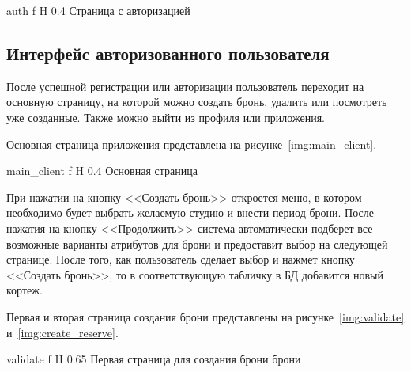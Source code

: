 {auth} %
{f} %
{H} %
{0.4\textwidth} %
{Страница с авторизацией} %



\subsection{Интерфейс авторизованного пользователя}
После успешной регистрации или авторизации пользователь переходит на основную страницу, на которой можно создать бронь, удалить или посмотреть уже созданные.
Также можно выйти из профиля или приложения.

Основная страница приложения представлена на рисунке~\ref{img:main_client}.



{main_client} %
{f} %
{H} %
{0.4\textwidth} %
{Основная страница} %



При нажатии на кнопку <<Создать бронь>> откроется меню, в котором необходимо будет выбрать желаемую студию и внести период брони.
После нажатия на кнопку <<Продолжить>> система автоматически подберет все возможные варианты атрибутов для брони и предоставит выбор на следующей странице.
После того, как пользователь сделает выбор и нажмет кнопку <<Создать бронь>>, то в соответствующую табличку в БД добавится новый кортеж.

Первая и вторая страница создания брони представлены на рисунке~\ref{img:validate} и~\ref{img:create_reserve}.


{validate} %
{f} %
{H} %
{0.65\textwidth} %
{Первая страница для создания брони брони} %


